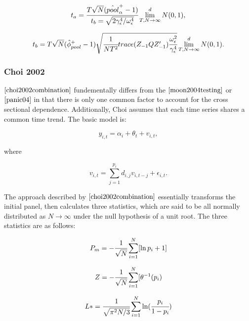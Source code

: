 \begin{equation}
t_a = \cfrac{T \sqrt{N} (\hat{pool}_{\alpha}^{+} -1)}{t_b = {\sqrt{2 \gamma_{\epsilon}^4/\omega_{\epsilon}^4}}} \lim_{{T,N} \to \infty}^d N(0,1) ,
\end{equation}

\begin{equation}
t_b = T \sqrt{N} ( \hat{\phi}_{pool}^{+} - 1) \sqrt{ \cfrac{1}{NT^2} trace(Z_{-1} QZ'_{-1} ) \cfrac{\omega^2_\epsilon}{\gamma_\epsilon^4}} \lim_{{T,N} \to \infty}^d N(0,1) .
\end{equation}

\subsubsection{Choi 2002}

$\cite{choi2002combination}$ fundementally differs from the $\cite{moon2004testing}$ or $\cite{panic04}$ in that there is only one common factor to account for the cross sectional dependence. Additionally, Choi assumes that each time series shares a common time trend. The basic model is:

\begin{equation}
y_{i,t} = \alpha_i + \theta_t + v_{i,t},
\end{equation}

where

\begin{equation}
v_{i,t} = \sum_{j=1}^{p_i} d_{i,j} v_{i,t-j} + \epsilon_{i,t}.
\end{equation}

The approach described by $\cite{choi2002combination}$ essentially transforms the initial panel, then calculates three statistics, which are said to be all normally distributed as $ N \to \infty$ under the null hypothesis of a unit root. The three statistics are as follows:

\begin{equation}
P_m = - \cfrac{1}{\sqrt{N}} \sum_{i=1}^{N} [ \ln {p_i} + 1 ]
\end{equation}

\begin{equation}
Z = - \cfrac{1}{\sqrt{N}} \sum_{i=1}^{N} [ \theta^{-1} (p_i)
\end{equation}

\begin{equation}
L* = \cfrac{1}{\sqrt{\pi^2 N / 3}} \sum_{i=1}^{N} \ln ( \cfrac{p_i}{1 - p_i})
\end{equation}




